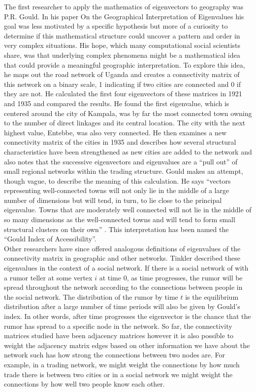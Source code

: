 \documentclass{article}
\begin{document}
The first researcher to apply the mathematics of eigenvectors to geography was P.R. Gould.  In his paper On the Geographical Interpretation of Eigenvalues his goal was less motivated by a specific hypothesis but more of a curiosity to determine if this mathematical structure could uncover a pattern and order in very complex situations.  His hope, which many computational social scientists share, was that underlying complex phenomena might be a mathematical idea that could provide a meaningful geographic interpretation.  To explore this idea, he maps out the road network of Uganda and creates a connectivity matrix of this network on a binary scale, 1 indicating if two cities are connected and 0 if they are not.  He calculated the first four eigenvectors of these matrices in 1921 and 1935 and compared the results.  He found the first eigenvalue, which is centered around the city of Kampala, was by far the most connected town owning to the number of direct linkages and its central location.  The city with the next highest value, Entebbe, was also very connected.  He then examines a new connectivity matrix of the cities in 1935 and describes how several structural characteristics have been strengthened as new cities are added to the network and also notes that the successive eigenvectors and eigenvalues are a “pull out” of small regional networks within the trading structure.  Gould makes an attempt, though vague, to describe the meaning of this calculation.  He says “vectors representing well-connected towns will not only lie in the middle of a large number of dimensions but will tend, in turn, to lie close to the principal eigenvalue.  Towns that are moderately well connected will not lie in the middle of so many dimensions as the well-connected towns and will tend to form small structural clusters on their own” .  This interpretation has been named the “Gould Index of Accessibility”.\\

Other researchers have since offered analogous definitions of eigenvalues of the connectivity matrix in geographic and other networks.  Tinkler described these eigenvalues in the context of a social network.  If there is a social network of with a rumor teller at some vertex $i$ at time 0, as time progresses, the rumor will be spread throughout the network according to the connections between people in the social network.  The distribution of the rumor by time $t$ is the equilibrium distribution after a large number of time periods will also be given by Gould’s index.   In other words, after time progresses the eigenvector is the chance that the rumor has spread to a specific node in the network.  So far, the connectivity matrices studied have been adjacency matrices however it is also possible to weight the adjacency matrix edges based on other information we have about the network such has how strong the connections between two nodes are.  For example, in a trading network, we might weight the connections by how much trade there is between two cities or in a social network we might weight the connections by how well two people know each other.\\
\end{document}
